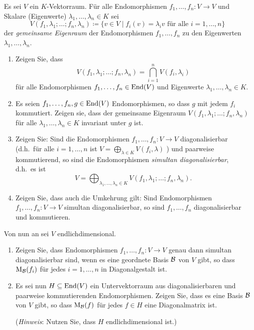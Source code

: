 \begin{question}[subtitle = Simultane Diagonalisierbarkeit]{2}
  Es sei $V$ ein $K$-Vektorraum.
  Für alle Endomorphismen $f_1, \dotsc, f_n \colon V  \to V$ und Skalare (Eigenwerte) \mbox{$\lambda_1, \dotsc, \lambda_n \in K$} sei
  \[
              V(f_1, \lambda_1; \dotsc; f_n, \lambda_n)
    \coloneqq \{ v \in V \mid \text{$f_i(v) = \lambda_i v$ für alle $i = 1, \dotsc, n$} \}
  \]
  der \emph{gemeinsame Eigenraum} der Endomorphismen $f_1, \dotsc, f_n$ zu den Eigenwerten $\lambda_1, \dotsc, \lambda_n$.
  \begin{enumerate}[leftmargin=*]
    \item
      Zeigen Sie, dass
      \[
          V(f_1, \lambda_1; \dotsc; f_n, \lambda_n)
        = \bigcap_{i=1}^n V(f_i, \lambda_i)
      \]
      für alle Endomorphismen $f_1, \dotsc, f_n \in \operatorname{End}(V)$ und Eigenwerte $\lambda_1, \dotsc, \lambda_n \in K$.
    \item
      Es seien $f_1, \dotsc, f_n, g \in \operatorname{End}(V)$ Endomorphismen, so dass $g$ mit jedem $f_i$ kommutiert.
      Zeigen sie, dass der gemeinsame Eigenraum $V(f_1, \lambda_1; \dots; f_n, \lambda_n)$ für alle $\lambda_1, \dotsc, \lambda_n \in K$ invariant unter $g$ ist.
    \item
      Zeigen Sie: Sind die Endomorphismen $f_1, \dotsc, f_n \colon V \to V$ diagonalisierbar (d.h.\ für alle $i = 1, \dotsc, n$ ist $V = \bigoplus_{\lambda \in K} V(f_i, \lambda)$ ) und paarweise kommutierend, so sind die Endomorphismen \emph{simultan diagonalisierbar}, d.h.\ es ist
      \[
          V
        = \bigoplus_{\lambda_1, \dotsc, \lambda_n \in K}  V(f_1, \lambda_1; \dotsc; f_n, \lambda_n).
      \]
    \item
      Zeigen Sie, dass auch die Umkehrung gilt:
      Sind Endomorphismen $f_1, \dotsc, f_n \colon V \to V$ simultan diagonalisierbar, so sind $f_1, \dotsc, f_n$ diagonalisierbar und kommutieren.
  \end{enumerate}
  Von nun an sei $V$ endlichdimensional.
  \begin{enumerate}[resume]
    \item
      Zeigen Sie, dass Endomorphismen $f_1, \dotsc, f_n \colon V \to V$ genau dann simultan diagonalisierbar sind, wenn es eine geordnete Basis $\mathcal{B}$ von $V$ gibt, so dass $\operatorname{M}_{\mathcal{B}}(f_i)$ für jedes $i = 1, \dotsc, n$ in Diagonalgestalt ist.
    \item
      Es sei nun $H \subseteq \operatorname{End}(V)$ ein Untervektorraum aus diagonalisierbaren und paarweise kommutierenden Endomorphismen.
      Zeigen Sie, dass es eine Basis $\mathcal{B}$ von $V$ gibt, so dass $\operatorname{M}_{\mathcal{B}}(f)$ für jedes $f \in H$ eine Diagonalmatrix ist.
      
      (\emph{Hinweis}:
       Nutzen Sie, dass $H$ endlichdimensional ist.)
  \end{enumerate}
\end{question}


